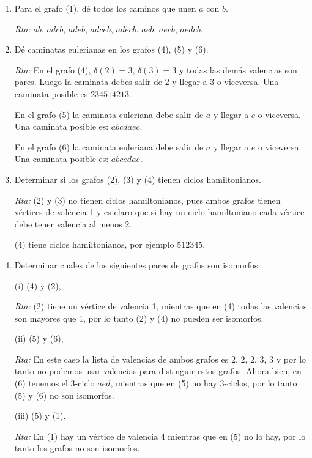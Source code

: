 \documentclass[a4paper,12pt,twoside,spanish,reqno]{amsbook}
\numberwithin{equation}{section}
\newcommand{\rta}{\noindent\textit{Rta: }}
\begin{document}
\begin{enumerate}
\begin{enumerate}
        \item Para el grafo (1), dé todos los caminos que unen $a$ con $b$.
        
        \rta $ab$, $adcb$, $adeb$, $adceb$, $adecb$, $aeb$, $aecb$, $aedcb$.  
        
        
        \item Dé caminatas eulerianas en los grafos (4), (5) y (6).
        
        \rta  En  el  grafo (4), $\delta(2)=3$, $\delta(3)=3$ y todas las demás valencias son pares. Luego la caminata debes salir de $2$ y llegar a $3$ o viceversa. Una caminata posible es $234514213$.    
        
        En  el grafo (5) la caminata euleriana debe salir de $a$ y llegar a $c$ o viceversa. Una caminata posible es: $abcdaec$.
        
        En  el grafo (6) la caminata euleriana debe salir de $a$ y llegar a $e$ o viceversa. Una caminata posible es: $abcedae$.
        
        \item  Determinar si los grafos (2), (3) y (4) tienen ciclos hamiltonianos.
        
        \rta (2) y (3) no tienen ciclos hamiltonianos, pues ambos grafos tienen vértices de valencia 1 y  es claro que si hay un ciclo hamiltoniano cada vértice debe tener valencia al menos 2. 

        (4) tiene ciclos hamiltonianos, por ejemplo $512345$.
        
        
        \item Determinar cuales de los siguientes pares de grafos son isomorfos:
        
        (i) (4) y (2),\quad 
        
        \rta (2) tiene un vértice de  valencia 1, mientras que en  (4) todas las valencias son mayores que 1, por lo tanto (2) y (4) no pueden ser isomorfos. 
        
        (ii) (5) y (6), \quad 
        
        \rta En este caso  la lista de valencias de ambos grafos es 2, 2, 2, 3, 3 y por lo tanto no podemos usar valencias para distinguir estos grafos. Ahora bien, en (6) tenemos el 3-ciclo $aed$, mientras que en (5) no hay 3-ciclos, por lo tanto (5) y (6) no son isomorfos.   
        
        (iii) (5) y (1). 
        
        \rta 
        En (1) hay un vértice de valencia 4 mientras que  en (5) no lo hay, por lo tanto los grafos no son isomorfos. 
        

\end{enumerate}
\end{enumerate}
\end{document}
